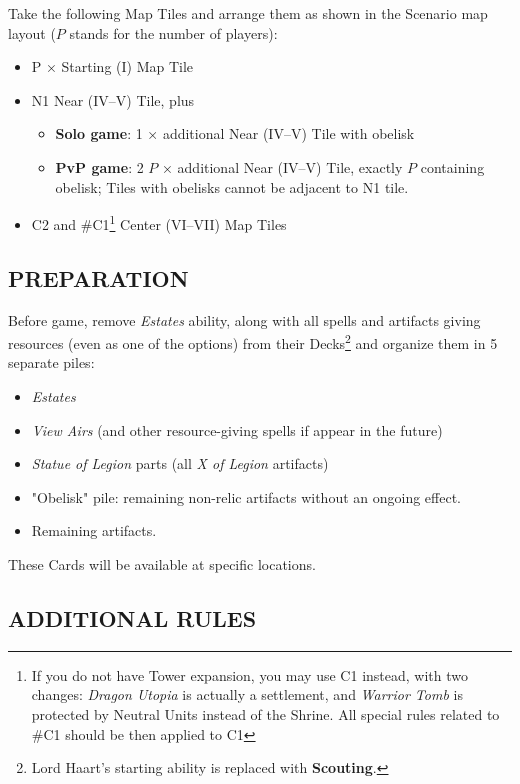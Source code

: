 \begin{multicols*}{2}
    Take the following Map Tiles and arrange them as shown in the Scenario map layout ($P$ stands for the number of players):
    \begin{itemize}
        \item P × Starting (I) Map Tile
        \item N1 Near (IV--V) Tile, plus \begin{itemize}
            \item \textbf{Solo game}: 1 × additional Near (IV--V) Tile with obelisk
            \item \textbf{PvP game}: 2 $P$ × additional Near (IV--V) Tile, exactly $P$ containing obelisk; Tiles with obelisks cannot be adjacent to N1 tile.
        \end{itemize}
        \item C2 and \#C1\footnote{If you do not have Tower expansion, you may use C1 instead, with two changes: \textit{Dragon Utopia} is actually a settlement, and \textit{Warrior Tomb} is protected by Neutral Units instead of the Shrine. All special rules related to \#C1 should be then applied to C1} Center (VI--VII) Map Tiles
    \end{itemize}

    \subsection*{\MakeUppercase{Preparation}}

    Before game, remove \textit{Estates} ability, along with all spells and artifacts giving resources (even as one of the options) from their Decks\footnote{Lord Haart's starting ability is replaced with \textbf{Scouting}.} and organize them in 5 separate piles:

    \begin{itemize}
        \item \textit{Estates}
        \item \textit{View Airs} (and other resource-giving spells if appear in the future)
        \item \textit{Statue of Legion} parts (all \textit{X of Legion} artifacts)
        \item "Obelisk" pile: remaining non-relic artifacts without an ongoing effect.
        \item Remaining artifacts.
    \end{itemize}

    These Cards will be available at specific locations.

    \subsection*{\MakeUppercase{Additional Rules}}


\end{multicols*}
